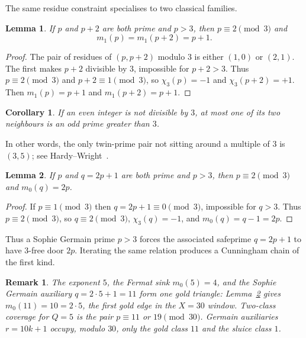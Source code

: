 \documentclass[11pt,a4paper]{article}
\newtheorem{lemma}{Lemma}
\newtheorem{corollary}{Corollary}
\newtheorem{remark}{Remark}
\begin{document}
The same residue constraint specialises to two classical families.

\begin{lemma}
\label{lem:twins}
If \(p\) and \(p+2\) are both prime and \(p>3\), then \(p\equiv 2\pmod{3}\) and
\[
m_1(p)=m_1(p+2)=p+1.
\]
\end{lemma}

\begin{proof}
The pair of residues of \((p,p+2)\) modulo \(3\) is either \((1,0)\) or \((2,1)\).
The first makes \(p+2\) divisible by \(3\), impossible for \(p+2>3\).
Thus \(p\equiv 2\pmod{3}\) and \(p+2\equiv 1\pmod{3}\), so \(\chi_3(p)=-1\) and \(\chi_3(p+2)=+1\).
Then \(m_1(p)=p+1\) and \(m_1(p+2)=p+1\).
\end{proof}

\begin{corollary}
\label{cor:one-neighbour}
If an even integer is not divisible by \(3\), at most one of its two neighbours is an odd prime greater than \(3\).
\end{corollary}

In other words, the only twin-prime pair not sitting around a multiple of \(3\) is \((3,5)\); see Hardy--Wright~\cite[Ch.~1]{HW}.

\begin{lemma}
\label{lem:sg}
If \(p\) and \(q=2p+1\) are both prime and \(p>3\), then \(p\equiv 2\pmod{3}\) and \(m_0(q)=2p\).
\end{lemma}

\begin{proof}
If \(p\equiv 1\pmod{3}\) then \(q=2p+1\equiv 0\pmod{3}\), impossible for \(q>3\).
Thus \(p\equiv 2\pmod{3}\), so \(q\equiv 2\pmod{3}\), \(\chi_3(q)=-1\), and \(m_0(q)=q-1=2p\).
\end{proof}

Thus a Sophie Germain prime \(p>3\) forces the associated safeprime \(q=2p+1\) to have 3-free door \(2p\).
Iterating the same relation produces a Cunningham chain of the first kind.

\begin{remark}
\label{rem:five-triangle}
The exponent \(5\), the Fermat sink \(m_0(5)=4\), and the Sophie Germain auxiliary \(q=2\cdot 5+1=11\) form one gold triangle: Lemma~\ref{lem:sg} gives \(m_0(11)=10=2\cdot 5\), the first gold edge in the \(X=30\) window. Two-class coverage for \(Q=5\) is the pair \(p\equiv 11\) or \(19\pmod{30}\). Germain auxiliaries \(r=10k+1\) occupy, modulo \(30\), only the gold class \(11\) and the sluice class \(1\).
\end{remark}
\end{document}
